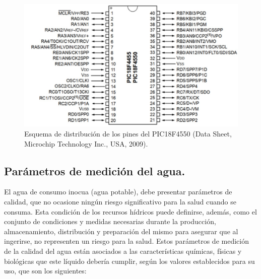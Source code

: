 \documentclass[conference]{IEEEtran}
\begin{document}
	\begin{figure}[htbp]
		\centering
		\includegraphics[width=0.6\columnwidth]{fig9.jpg}
		\caption{Esquema de distribución de los pines del PIC18F4550 (Data Sheet, Microchip Technology Inc., USA, 2009).}
		\label{fig:9}
	\end{figure}
	
	\subsection{Parámetros de medición del agua.}
	El agua de consumo inocua (agua potable), debe presentar parámetros de calidad, que no ocasione ningún riesgo significativo para la salud cuando se consuma. Esta condición de los recursos hídricos puede definirse, además, como el conjunto de condiciones y medidas necesarias durante la producción, almacenamiento, distribución y preparación del mismo para asegurar que al ingerirse, no representen un riesgo para la salud. Estos parámetros de medición de la calidad del agua están asociados a las características químicas, físicas y biológicas que este líquido debería cumplir, según los valores establecidos para su uso, que son los siguientes:
	
\end{document}
